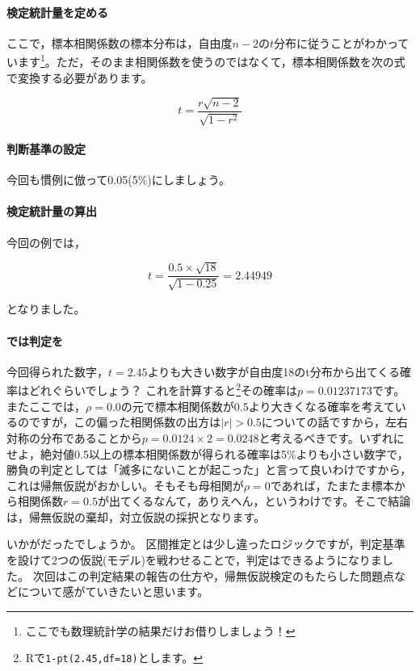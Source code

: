 \documentclass{ltjsbook}
\begin{document}
\paragraph{検定統計量を定める}

ここで，標本相関係数の標本分布は，自由度$n-2$の$t$分布に従うことがわかっています\footnote{ここでも数理統計学の結果だけお借りしましょう！}。ただ，そのまま相関係数を使うのではなくて，標本相関係数を次の式で変換する必要があります。

\[ t = \frac{r\sqrt{n-2}}{\sqrt{1-r^2}} \]

\paragraph{判断基準の設定}
今回も慣例に倣って0.05(5\%)にしましょう。

\paragraph{検定統計量の算出}

今回の例では，

\[ t = \frac{0.5 \times \sqrt{18}}{\sqrt{1-0.25}} = 2.44949 \]

となりました。

\paragraph{では判定を}

今回得られた数字，$t=2.45$よりも大きい数字が自由度18のt分布から出てくる確率はどれぐらいでしょう？ これを計算すると\footnote{Rで\texttt{1-pt(2.45,df=18)}とします。}その確率は$p=0.01237173$です。またここでは，$\rho=0.0$の元で標本相関係数が$0.5$より大きくなる確率を考えているのですが，この偏った相関係数の出方は$|r|>0.5$についての話ですから，左右対称の分布であることから$p=0.0124\times2=0.0248$と考えるべきです。いずれにせよ，絶対値0.5以上の標本相関係数が得られる確率は5\%よりも小さい数字で，勝負の判定としては「滅多にないことが起こった」と言って良いわけですから，これは帰無仮説がおかしい。そもそも母相関が$\rho=0$であれば，たまたま標本から相関係数$r=0.5$が出てくるなんて，ありえへん，というわけです。そこで結論は，帰無仮説の棄却，対立仮説の採択となります。




いかがだったでしょうか。
区間推定とは少し違ったロジックですが，判定基準を設けて2つの仮説(モデル)を戦わせることで，判定はできるようになりました。
次回はこの判定結果の報告の仕方や，帰無仮説検定のもたらした問題点などについて感がていきたいと思います。
\end{document}
